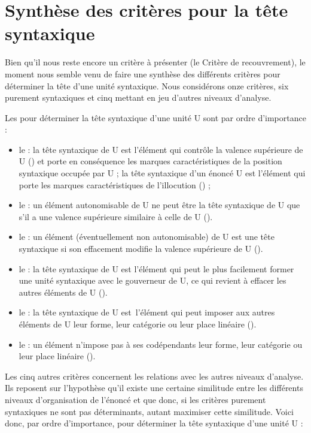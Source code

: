 \section{Synthèse des critères pour la tête syntaxique}\label{sec:3.3.20}\largerpage

Bien qu’il nous reste encore un critère à présenter (le Critère de recouvrement), le moment nous semble venu de faire une synthèse des différents critères pour déterminer la tête d’une unité syntaxique. Nous considérons onze critères, six purement syntaxiques et cinq mettant en jeu d’autres niveaux d’analyse.

Les  pour déterminer la tête syntaxique d’une unité U sont par ordre d’importance :

\begin{itemize}
\item le  : la tête syntaxique de U est l’élément qui contrôle la valence supérieure de U () et porte en conséquence les marques caractéristiques de la position syntaxique occupée par U ; la tête syntaxique d’un énoncé U est l’élément qui porte les marques caractéristiques de l’illocution () ;
\item le : un élément autonomisable de U ne peut être la tête syntaxique de U que s’il a une valence supérieure similaire à celle de U ().
\item le : un élément (éventuellement non autonomisable) de U est une tête syntaxique si son effacement modifie la valence supérieure de U ().
\item le   : la tête syntaxique de U est l’élément qui peut le plus facilement former une unité syntaxique avec le gouverneur de U, ce qui revient à effacer les autres éléments de U ().
\item le  : la tête syntaxique de U est~l’élément qui peut imposer aux autres éléments de U leur forme, leur catégorie ou leur place linéaire ().
\item le  : un élément n'impose pas à ses codépendants leur forme, leur catégorie ou leur place linéaire ().
\end{itemize}

Les cinq autres critères concernent les relations avec les autres niveaux d’analyse. Ils reposent sur l’hypothèse qu’il existe une certaine similitude entre les différents niveaux d’organisation de l’énoncé et que donc, si les critères purement syntaxiques ne sont pas déterminants, autant maximiser cette similitude. Voici donc, par ordre d’importance,  pour déterminer la tête syntaxique d’une unité U :

